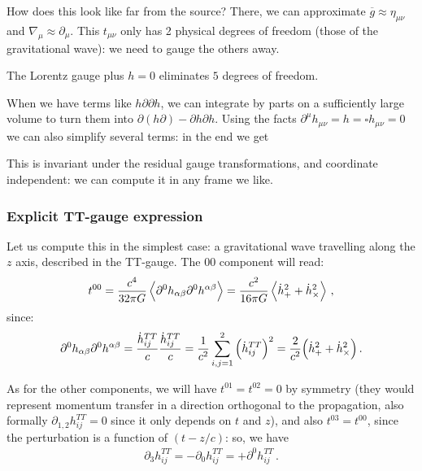 \documentclass[main.tex]{subfiles}
\begin{document}
How does this look like far from the source?
There, we can approximate \(\overline{g} \approx \eta_{\mu \nu }\) and \(\nabla_{\mu } \approx \partial_{\mu }\). 
This \(t_{\mu \nu }\) only has 2 physical degrees of freedom (those of the gravitational wave): we need to gauge the others away.

The Lorentz gauge plus \(h=0\) eliminates \(5\) degrees of freedom. 

When we have terms like \(h \partial \partial h\), we can integrate by parts on a sufficiently large volume to turn them into \(\partial(h \partial ) - \partial h \partial h\). 
Using the facts \(\partial^{\mu }h_{\mu \nu } = h = \square h_{\mu \nu } = 0\) we can also simplify several terms: in the end we get 
%

This is invariant under the residual gauge transformations, and coordinate independent: we can compute it in any frame we like.

\subsubsection{Explicit TT-gauge expression}

Let us compute this in the simplest case: a gravitational wave travelling along the \(z\) axis, described in the TT-gauge.
The 00 component will read: 
%
\begin{align}
t^{00 } = \frac{c^{4}}{32 \pi G} \expval{\partial^{0} h_{\alpha \beta } \partial^{0} h^{\alpha \beta }} = \frac{c^2}{16 \pi G} \expval{\dot{h}^2_{+} + \dot{h}^2_{ \times }}
\,,
\end{align}
%
since: 
%
\begin{align}
\partial^{0} h_{\alpha \beta } \partial^{0} h^{\alpha \beta } =
\frac{\dot{h}^{TT}_{ij}}{c} \frac{\dot{h}^{TT}_{ij}}{c} 
= \frac{1}{c^2}\sum _{i, j =1}^{2} \qty(\dot{h}_{ij}^{TT})^2 
= \frac{2}{c^2} \qty(\dot{h}_{+}^2 + \dot{h}_{ \times }^2)
\,.
\end{align}

As for the other components, we will have \(t^{01} = t^{02} =0 \) by symmetry (they would represent momentum transfer in a direction orthogonal to the propagation, also formally \(\partial_{1,2} h_{ij}^{TT} = 0\) since it only depends on \(t\) and \(z\)), and also \(t^{03}= t^{00}\), since the perturbation is a function of \((t - z/c)\): so, we have 
%
\begin{align}
\partial_{3} h_{ij}^{TT} = - \partial_{0} h_{ij}^{TT} = + \partial^{0} h_{ij}^{TT}
\,.
\end{align}
\end{document}
